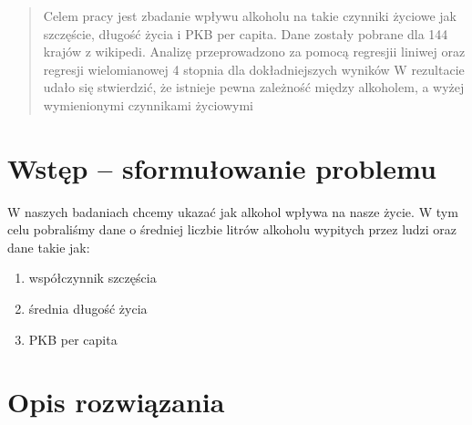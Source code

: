 \documentclass[10pt]{article}
\begin{document}


\begin{abstract}
Celem pracy jest zbadanie wpływu alkoholu na takie czynniki życiowe jak szczęście, długość życia i PKB per capita.
Dane zostały pobrane dla 144 krajów z wikipedi.
Analizę przeprowadzono za pomocą regresjii liniwej oraz regresji wielomianowej 4 stopnia dla dokładniejszych wyników
W rezultacie udało się stwierdzić, że istnieje pewna zależność między alkoholem, a wyżej wymienionymi czynnikami życiowymi
\end{abstract}

\section{Wstęp -- sformułowanie problemu}
\label{sec:wstep}

W naszych badaniach chcemy ukazać jak alkohol wpływa na nasze życie.
W tym celu pobraliśmy dane o średniej liczbie litrów alkoholu wypitych przez ludzi oraz dane takie jak:
\begin{enumerate}
    \item współczynnik szczęścia
    \item średnia długość życia
    \item PKB per capita
\end{enumerate}

\section{Opis rozwiązania}


\end{document}
